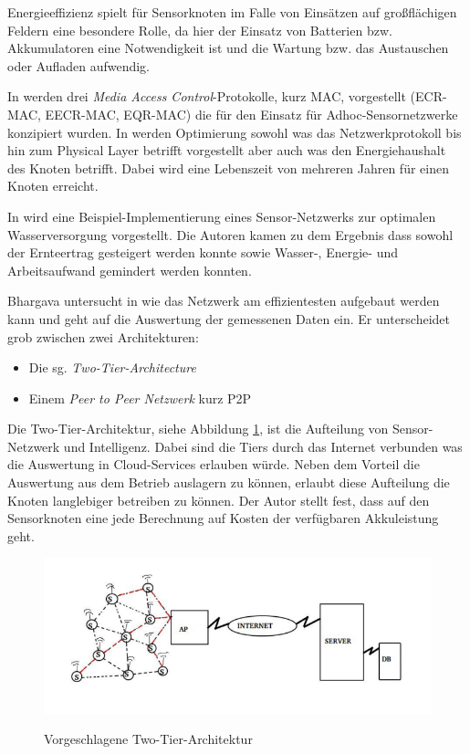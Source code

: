 Energieeffizienz spielt für Sensorknoten im Falle von Einsätzen auf großflächigen Feldern eine besondere Rolle, da hier der Einsatz von Batterien bzw. Akkumulatoren eine Notwendigkeit ist und die Wartung bzw. das Austauschen oder Aufladen aufwendig. 

In \cite{conf:Zia2013} werden drei \textit{Media Access Control}-Protokolle, kurz MAC, vorgestellt (ECR-MAC, EECR-MAC, EQR-MAC) die für den Einsatz für Adhoc-Sensornetzwerke konzipiert wurden. In \cite{jour:Jelicic2013} werden Optimierung sowohl was das Netzwerkprotokoll bis hin zum Physical Layer betrifft vorgestellt aber auch was den Energiehaushalt des Knoten betrifft. Dabei wird eine Lebenszeit von mehreren Jahren für einen Knoten erreicht.

In \cite{jour:Nandurkar2014} wird eine Beispiel-Implementierung eines Sensor-Netzwerks zur optimalen Wasserversorgung vorgestellt. Die Autoren kamen zu dem Ergebnis dass sowohl der Ernteertrag gesteigert werden konnte sowie Wasser-, Energie- und Arbeitsaufwand gemindert werden konnten.

Bhargava untersucht in \cite{jour:Bhargava2014} wie das Netzwerk am effizientesten aufgebaut werden kann und geht auf die Auswertung der gemessenen Daten ein. Er unterscheidet grob zwischen zwei Architekturen:
\begin{itemize}
	\item Die sg. \textit{Two-Tier-Architecture}
	\item Einem \textit{Peer to Peer Netzwerk} kurz P2P
\end{itemize}

Die Two-Tier-Architektur, siehe Abbildung \ref{fig:two_tier_architecture}, ist die Aufteilung von Sensor-Netzwerk und Intelligenz. Dabei sind die Tiers durch das Internet verbunden was die Auswertung in Cloud-Services erlauben würde. Neben dem Vorteil die Auswertung aus dem Betrieb auslagern zu können, erlaubt diese Aufteilung die Knoten langlebiger betreiben zu können. Der Autor stellt fest, dass auf den Sensorknoten eine jede Berechnung auf Kosten der verfügbaren Akkuleistung geht.\cite{jour:Bhargava2014}

\begin{figure}[h]
 \includegraphics[scale=0.65,natwidth=\textwidth]{figures/sensors/two_tier_architecture.png}
 \centering
 \label{fig:two_tier_architecture}
 \caption{Vorgeschlagene Two-Tier-Architektur \cite{jour:Bhargava2014}}
\end{figure}

